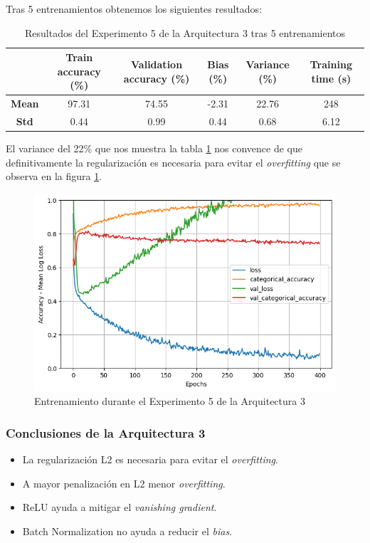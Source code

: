 \documentclass{article}
\begin{document}
			Tras 5 entrenamientos obtenemos los siguientes resultados:
			\begin{table}[!h]
				\begin{center}
					\begin{tabular}{ c | c | c | c | c | c |}
						\ & \textbf{Train accuracy (\%)} & \textbf{Validation accuracy (\%)} & \textbf{Bias (\%)} & \textbf{Variance (\%)} & \textbf{Training time (s)} \\ \hline
						\textbf{Mean} & 97.31 & 74.55 & -2.31 & 22.76 & 248 \\ \hline
						\textbf{Std} & 0.44 & 0.99 & 0.44 & 0.68 & 6.12 \\ \hline
					\end{tabular}
					\caption{Resultados del Experimento 5 de la Arquitectura 3 tras 5 entrenamientos}
					\label{tab:res-d-a3-e5}
				\end{center}
			\end{table}
			
			El variance del 22\% que nos muestra la tabla \ref{tab:res-d-a3-e5} nos convence de que definitivamente la regularizaci\'on es necesaria para evitar el \textit{overfitting} que se observa en la figura \ref{d-tr-a3-e5}.
			
			\begin{figure}[!h]
				\begin{center}
					\includegraphics[scale=0.5]{d-tr-a3-e5.png}		
					\caption{Entrenamiento durante el Experimento 5 de la Arquitectura 3}	
					\label{d-tr-a3-e5}
				\end{center}
			\end{figure}
		
		\subsubsection{Conclusiones de la Arquitectura 3}
		\label{d-cl-a3}
			\begin{itemize}
				\item La regularizaci\'on L2 es necesaria para evitar el \textit{overfitting}.
				\item A mayor penalizaci\'on en L2 menor \textit{overfitting}.
				\item ReLU ayuda a mitigar el \textit{vanishing gradient}.
				\item Batch Normalization no ayuda a reducir el \textit{bias}.
			\end{itemize}
			
\end{document}
